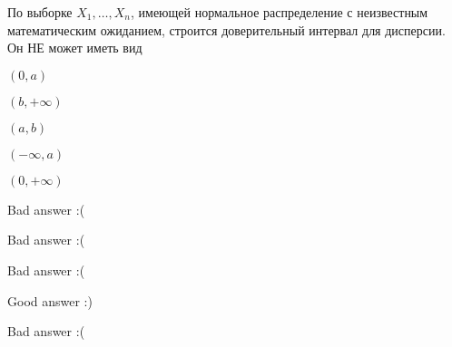 
\begin{question}
По выборке \(X_1,\ldots,X_{n}\), имеющей нормальное распределение с
неизвестным математическим ожиданием, строится доверительный интервал
для дисперсии. Он НЕ может иметь вид
\begin{answerlist}
  \item \((0, a)\)
  \item \((b, +\infty)\)
  \item \((a, b)\)
  \item \((-\infty, a)\)
  \item \((0, +\infty)\)
\end{answerlist}
\end{question}

\begin{solution}
\begin{answerlist}
  \item Bad answer :(
  \item Bad answer :(
  \item Bad answer :(
  \item Good answer :)
  \item Bad answer :(
\end{answerlist}
\end{solution}

